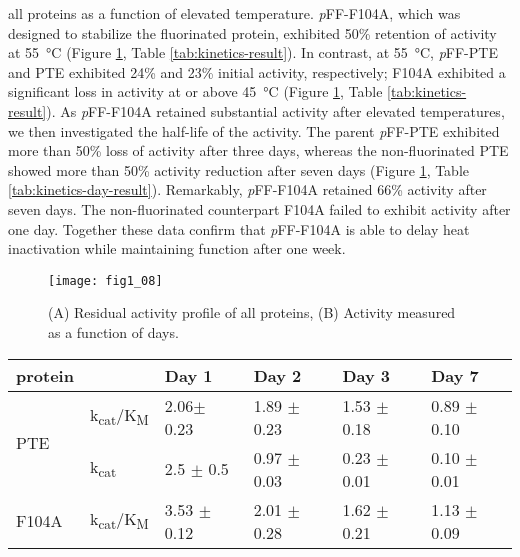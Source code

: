 \begin{refsection}
all proteins as a function of elevated temperature. \emph{p}FF-F104A, which was
designed to stabilize the fluorinated protein, exhibited 50\% retention of
activity at \SI{55}{\celsius} (Figure \ref{fig:kinetics-fig}, Table
\ref{tab:kinetics-result}). In contrast, at \SI{55}{\celsius}, \emph{p}FF-PTE
and PTE exhibited 24\% and 23\% initial activity, respectively; F104A exhibited
a significant loss in activity at or above \SI{45}{\celsius} (Figure
\ref{fig:kinetics-fig}, Table \ref{tab:kinetics-result}). As \emph{p}FF-F104A
retained substantial activity after elevated temperatures, we then investigated
the half-life of the activity. The parent \emph{p}FF-PTE exhibited more than
50\% loss of activity after three days, whereas the non-fluorinated PTE showed
more than 50\% activity reduction after seven days (Figure
\ref{fig:kinetics-fig}, Table \ref{tab:kinetics-day-result}).  Remarkably,
\emph{p}FF-F104A retained 66\% activity after seven days. The non-fluorinated
counterpart F104A failed to exhibit activity after one day.  Together these
data confirm that \emph{p}FF-F104A is able to delay heat inactivation while
maintaining function after one week.

\begin{figure}[h!] \centering \texttt{[image: fig1\_08]}
    \caption[(A) Residual activity profile of all proteins, (B) Activity
    measured as a function of days.]{(A) Residual activity profile of all
    proteins, (B) Activity measured as a function of days.} 
    \label{fig:kinetics-fig} 
\end{figure}

\begin{table}[h!]
\centering
    \begin{tabular}{llllll}
    \hline
    protein                 &  & Day 1 & Day 2 & Day 3 & Day 7\\ 
    \hline
    \multirow{2}{*}{PTE}    & k\textsubscript{cat}/K\textsubscript{M} & 2.06$
    \pm$ 0.23 & 1.89 $\pm$ 0.23 & 1.53 $\pm$ 0.18 & 0.89 $\pm$ 0.10 \\
    
    & k\textsubscript{cat} & 2.5 $\pm$ 0.5 & 0.97 $\pm$ 0.03 & 0.23 $\pm$ 0.01 & 0.10
    $\pm$ 0.01 \\
    \multirow{2}{*}{F104A}  & k\textsubscript{cat}/K\textsubscript{M} & 3.53
    $\pm$ 0.12 & 2.01 $\pm$ 0.28 & 1.62 $\pm$ 0.21 & 1.13 $\pm$ 0.09 \\ 
    

\end{tabular}
\end{table}
\end{refsection}
